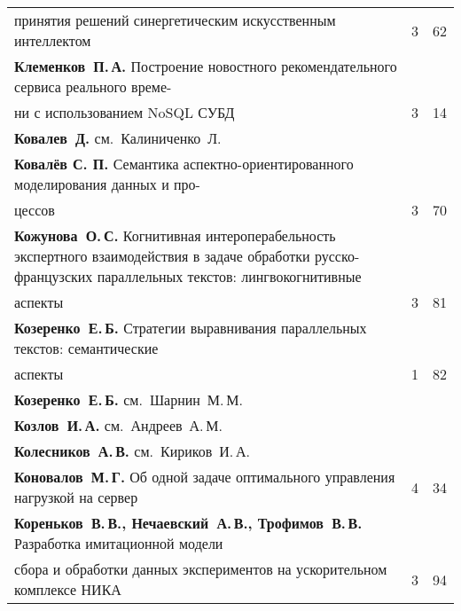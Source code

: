 {\begin{tabular}{p{388pt}rr}
\hspace*{23pt}принятия решений синергетическим искусственным интеллектом\dotfill&3&62\\
\textbf{Клеменков~П.\,А.}
Построение новостного рекомендательного сервиса реального време-\linebreak
\vspace*{-12pt}\\
\hspace*{23pt}ни с использованием NoSQL СУБД\dotfill&3&14\\
\textbf{Ковалев~Д.} см.~Калиниченко~Л.&&\\
\textbf{Ковалёв С. П.}
Семантика аспектно-ориентированного моделирования данных и про-\linebreak
\vspace*{-12pt}\\
\hspace*{23pt}цессов\dotfill&3&70\\
\hangindent=23pt\noindent\textbf{Кожунова~О.\,С.}
Когнитивная интероперабельность экспертного взаимодействия в задаче обработки
русско-французских параллельных текстов: лингвокогнитивные\linebreak
\vspace*{-12pt}\\
\hspace*{23pt}аспекты\dotfill&3&81\\
\textbf{Козеренко~Е.\,Б.}
Стратегии выравнивания параллельных текстов: семантические\linebreak
\vspace*{-12pt}\\
\hspace*{23pt}аспекты\dotfill&1&82\\
\textbf{Козеренко~Е.\,Б.} см.~Шарнин~М.\,М.&&\\
\textbf{Козлов~И.\,А.} см.~Андреев~А.\,М.&&\\
\textbf{Колесников~А.\,В.} см.~Кириков~И.\,А.&&\\
\textbf{Коновалов~М.\,Г.}
Об одной задаче оптимального управления нагрузкой на сервер\dotfill&4&34\\
\textbf{Кореньков~В.\,В., Нечаевский~А.\,В., Трофимов~В.\,В.}
Разработка имитационной модели\linebreak
\vspace*{-12pt}\\
\hspace*{23pt}сбора и обработки данных экспериментов на
ускорительном комплексе НИКА&3&94\\

\end{tabular}}
